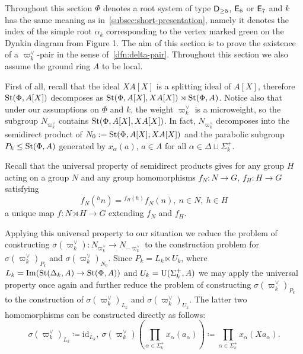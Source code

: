 Throughout this section $\Phi$ denotes a root system of type $\mathsf{D}_{\geq 5}$, $\mathsf{E}_6$ or $\mathsf{E}_7$ and
 $k$ has the same meaning as in~\cref{subsec:short-presentation}, namely
 it denotes the index of the simple root $\alpha_k$ corresponding to the vertex marked green on the Dynkin diagram from Figure 1.
The aim of this section is to prove the existence of a $\varpi_k^\vee$-pair in the sense of~\cref{dfn:delta-pair}.
Throughout this section we also assume the ground ring $A$ to be local.

First of all, recall that the ideal $XA[X]$ is a splitting ideal of $A[X]$, therefore
 $\operatorname{St}(\Phi, A[X])$ decomposes as $\operatorname{St}(\Phi, A[X], XA[X]) \rtimes \operatorname{St}(\Phi, A)$.
Notice also that under our assumptions on $\Phi$ and $k$, the weight $\varpi_k^\vee$ is a microweight, so the subgroup $N_{\varpi_k^\vee}$ contains $\operatorname{St}(\Phi, A[X], XA[X])$.
In fact, $N_{\varpi_k^\vee}$ decomposes into the semidirect product of $N_0 := \operatorname{St}(\Phi, A[X], XA[X])$ and the parabolic subgroup $P_k \leq \operatorname{St}(\Phi, A)$
 generated by $x_\alpha(a)$, $a \in A$ for all $\alpha \in \Delta \sqcup \Sigma^+_k$.

Recall that the universal property of semidirect products gives for any group $H$ acting on a group $N$
 and any group homomorphisms $f_N\colon N \to G$, $f_H\colon H \to G$ satisfying
\begin{equation}
    \label{eq:coherence-condition} f_N({}^hn) = {}^{f_H(h)} f_N(n),\ n\in N,\ h\in H
\end{equation}
a unique map $f\colon N \rtimes H \to G$ extending $f_N$ and $f_H$.

Applying this universal property to our situation we reduce the problem of constructing $\sigma(\varpi_k^\vee) \colon N_{\varpi_k^\vee} \to N_{-\varpi_k^\vee}$
 to the construction problem for $\sigma(\varpi_k^\vee)_{P_k}$ and $\sigma(\varpi_k^\vee)_{N_0}$.
Since $P_k = L_k \ltimes U_k$, where $L_k = \mathrm{Im}(\operatorname{St}(\Delta_k, A) \to \operatorname{St}(\Phi, A))$
and $U_k = \operatorname{U}(\Sigma_k^+, A)$ we may apply the universal property once again and further reduce the problem of constructing $\sigma(\varpi_k^\vee)_{P_k}$
 to the construction of $\sigma(\varpi_k^\vee)_{L_k}$ and $\sigma(\varpi_k^\vee)_{U_k}$.
The latter two homomorphisms can be constructed directly as follows:
\[\sigma(\varpi_k^\vee)_{L_k} \coloneqq \mathrm{id}_{L_k},\ \sigma(\varpi_k^\vee)\left(\prod\limits_{\alpha \in \Sigma_k^+} x_\alpha(a_\alpha)\right) \coloneqq \prod\limits_{\alpha \in \Sigma_k^+} x_\alpha(Xa_\alpha).\]

